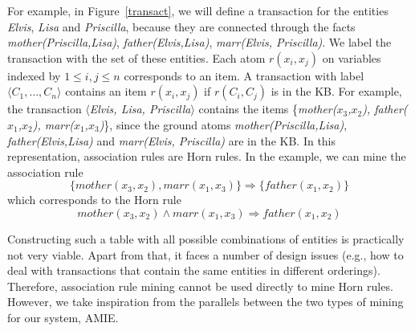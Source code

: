 For example, in Figure~\ref{transact}, we will define a transaction for the entities \emph{Elvis}, \emph{Lisa} and \emph{Priscilla}, because they are connected through the facts \emph{mother(Priscilla,Lisa)}, \emph{father(Elvis,Lisa)}, \emph{marr(Elvis, Priscilla)}.
We label the transaction with the set of these entities.
Each atom $r(x_i,x_j)$ on variables indexed by $1 \leq i, j \leq n$ corresponds to an item. A transaction with label $\langle C_1, \dots, C_n\rangle$ contains an item $r(x_i,x_j)$ if $r(C_i, C_j)$ is in the KB.
For example, the transaction  $\langle$\emph{Elvis, Lisa, Priscilla}$\rangle$ contains the items \{\emph{mother($x_3$,$x_2$), father($x_1$,$x_2$), marr($x_1$,$x_3$)}\}, 
since the ground atoms \emph{mother(Priscilla,Lisa)}, \emph{father(Elvis,Lisa)} and \emph{marr(Elvis, Priscilla)} are in the KB.
In this representation, association rules are Horn rules.
In the example, we can mine the association rule 
\[ \{mother(x_3,x_2),marr(x_1,x_3)\}\Rightarrow \{father(x_1,x_2)\} \]
which corresponds to the Horn rule 
\[ mother(x_3,x_2) \wedge marr(x_1,x_3) \Rightarrow father(x_1,x_2) \]


Constructing such a table with all possible combinations of entities is practically not very viable.
Apart from that, it faces a number of design issues (e.g., how to deal with transactions that contain the same entities in different orderings).
Therefore, association rule mining cannot be used directly to mine Horn rules. However, we take inspiration from the parallels between the two types of mining for our system, AMIE.

